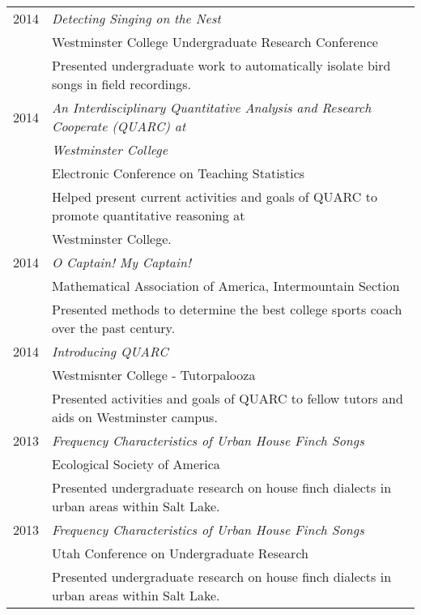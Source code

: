 \documentclass[a4paper,10pt]{article}
\begin{document}
\section{\color{linkcolour}{Selected Posters and Presentations}}
\begin{tabular}{rl}
 \textsc{2014}& \emph{Detecting Singing on the Nest}
\\& Westminster College Undergraduate Research Conference
\\& \small{Presented undergraduate work to automatically isolate bird songs in field recordings.} \\

\textsc{2014}& \emph{An Interdisciplinary Quantitative Analysis and Research Cooperate (QUARC) at} \\
&\emph{Westminster College}
\\ & Electronic Conference on Teaching Statistics
\\ & \small{Helped present current activities and goals of QUARC to promote quantitative reasoning at}
\\ &\small{ Westminster College.} \\

\textsc{2014}& \emph{O Captain! My Captain!}
\\& Mathematical Association of America, Intermountain Section
\\& \small{Presented methods to determine the best college sports coach over the past century.}  \\

\textsc{2014} &\emph{Introducing QUARC}
\\& Westmisnter College - Tutorpalooza
\\& \small{Presented activities and goals of QUARC to fellow tutors and aids on Westminster campus.} \\

\textsc{2013}& \emph{Frequency Characteristics of Urban House Finch Songs}
\\& Ecological Society of America
\\& \small{Presented undergraduate research on house finch dialects in urban areas within Salt Lake.} \\

\textsc{2013}& \emph{Frequency Characteristics of Urban House Finch Songs}
\\& Utah Conference on Undergraduate Research
\\& \small{Presented undergraduate research on house finch dialects in urban areas within Salt Lake.}
\end{tabular}
\end{document}
